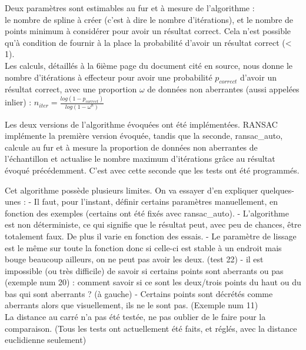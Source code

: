 \documentclass[a4paper,12pt]{article} %
\begin{document}
                    Deux paramètres sont estimables au fur et à mesure de l'algorithme :\\ le nombre de spline à créer (c'est à dire le nombre d'itérations), et le nombre de points minimum à considérer pour avoir un résultat correct. Cela n'est possible qu'à condition de fournir à la place la probabilité d'avoir un résultat correct (< 1). \\
                    Les calculs, détaillés à la 6ième page du document cité en source, nous donne le nombre d'itérations à effecteur pour avoir une probabilité $p_{correct}$ d'avoir un résultat correct, avec une proportion $\omega$ de données non aberrantes (aussi appelées inlier) : $n_{iter} = \frac{log(1 - p_{correct})}{log(1 - \omega^n)}$
                    
                    Les deux versions de l'algorithme évoquées ont été implémentées. RANSAC implémente la première version évoquée, tandis que la seconde, ransac\_auto, calcule au fur et à mesure la proportion de données non aberrantes de l'échantillon et actualise le nombre maximum d'itérations grâce au résultat évoqué précédemment.
                    C'est avec cette seconde que les tests ont été programmés.
                    
                    Cet algorithme possède plusieurs limites. On va essayer d'en expliquer quelques-unes :
                    - Il faut, pour l'instant, définir certains paramètres manuellement, en fonction des exemples (certains ont été fixés avec ransac\_auto). 
                    - L'algorithme est non déterministe, ce qui signifie que le résultat peut, avec peu de chances, être totalement faux. De plus il varie en fonction des essais.
                    - Le paramètre de lissage est le même sur toute la fonction donc si celle-ci est stable à un endroit mais bouge beaucoup ailleurs, on ne peut pas avoir les deux. (test 22)
                    - il est impossible (ou très difficile) de savoir si certains points sont aberrants ou pas (exemple num 20) : comment savoir si ce sont les deux/trois points du haut ou du bas qui sont aberrants ? (à gauche)
                    - Certains points sont décrétés comme aberrants alors que visuellement, ils ne le sont pas. (Exemple num 11)\\
                    La distance au carré n'a pas été testée, ne pas oublier de le faire pour la comparaison. (Tous les tests ont actuellement été faits, et réglés, avec la distance euclidienne seulement)
                    
\end{document}
